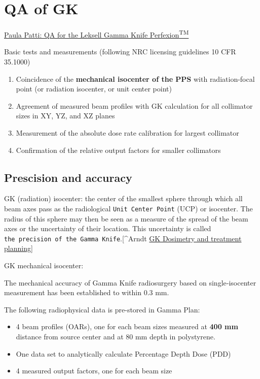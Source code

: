\documentclass[]{book}
\providecommand{\tightlist}{%
  \setlength{\itemsep}{0pt}\setlength{\parskip}{0pt}}
\theoremstyle{definition}
\theoremstyle{definition}
\theoremstyle{definition}
\theoremstyle{remark}
\begin{document}
\section{QA of GK}\label{qa-of-gk}

\href{https://vimeo.com/88176011}{Paula Patti: QA for the Leksell Gamma
Knife Perfexion\textsuperscript{TM}}

Basic tests and measurements (following NRC licensing guidelines 10 CFR
35.1000)

\begin{enumerate}
\def\labelenumi{\arabic{enumi}.}
\tightlist
\item
  Coincidence of the \textbf{mechanical isocenter of the PPS} with
  radiation-focal point (or radiation isocenter, or unit center point)
\item
  Agreement of measured beam profiles with GK calculation for all
  collimator sizes in XY, YZ, and XZ planes
\item
  Measurement of the absolute dose rate calibration for largest
  collimator
\item
  Confirmation of the relative output factors for smaller collimators
\end{enumerate}

\subsection{Prescision and accuracy}\label{prescision-and-accuracy}

GK (radiation) isocenter: the center of the smallest sphere through
which all beam axes pass as the radiological
\texttt{Unit\ Center\ Point} (UCP) or isocenter. The radius of this
sphere may then be seen as a measure of the spread of the beam axes or
the uncertainty of their location. This uncertainty is called
\texttt{the\ precision\ of\ the\ Gamma\ Knife}.{[}\^{}Arndt
\href{https://www.aapm.org/meetings/99AM/pdf/2756-33420.pdf}{GK
Dosimetry and treatment planning}{]}

GK mechanical isocenter:

The mechanical accuracy of Gamma Knife radiosurgery based on
single‐isocenter measurement has been established to within 0.3 mm.

The following radiophysical data is pre-stored in Gamma Plan:

\begin{itemize}
\tightlist
\item
  4 beam profiles (OARs), one for each beam sizes measured at
  \textbf{400 mm} distance from source center and at 80 mm depth in
  polystyrene.
\item
  One data set to analytically calculate Percentage Depth Dose (PDD)
\item
  4 measured output factors, one for each beam size
\end{itemize}
\end{document}
